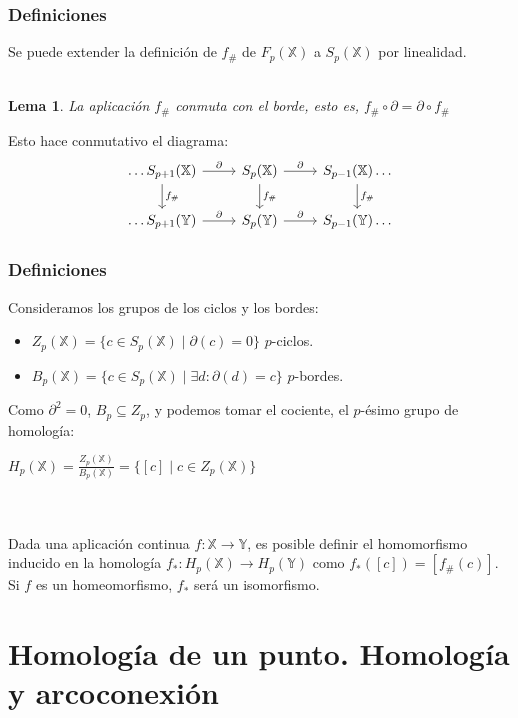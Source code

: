 \documentclass{beamer}
\def\X{{\mathbb X}}
\def\Y{{\mathbb Y}}
\theoremstyle{theorem}
\newtheorem{mylemma}{Lema}
\begin{document}
\begin{frame}[fragile]
  \frametitle{Definiciones}
  Se puede extender la definición de $f_\#$ de $F_p(\X)$ a $S_p(\X)$ por linealidad. \\~\\

  \begin{mylemma}
    La aplicación $f_\#$ conmuta con el borde, esto es, $f_\# \circ \partial = \partial \circ f_\#$
  \end{mylemma}

  Esto hace conmutativo el diagrama:
  \[
    \begin{tikzcd}
      \dots S_{p+1}(\X) \arrow{r}{\partial} \arrow{d}{f_\#} & S_p(\X) \arrow{r}{\partial} \arrow{d}{f_\#} & S_{p-1}(\X) \arrow{d}{f_\#} \dots \\
      \dots S_{p+1}(\Y) \arrow{r}{\partial}                 & S_p(\Y) \arrow{r}{\partial}                 & S_{p-1}(\Y) \dots
    \end{tikzcd}
  \]

\end{frame}



\begin{frame}
  \frametitle{Definiciones}
  Consideramos los grupos de los ciclos y los bordes:
  \begin{itemize}
    \item $Z_p(\X) = \{c \in S_p(\X) \mid \partial(c) = 0\}$ $p$-ciclos.
    \item $B_p(\X) = \{c \in S_p(\X) \mid \exists d \colon \partial(d) = c\}$ $p$-bordes.
  \end{itemize}

  Como $\partial^2 = 0$, $B_p \subseteq Z_p$, y podemos tomar el cociente, el $p$-ésimo grupo de homología:
  \centerline{$H_p(\X) = \frac{Z_p(\X)}{B_p(\X)} = \{[c] \mid c \in Z_p(\X)\}$} \\~\\

  Dada una aplicación continua $f \colon \X \to \Y$, es posible definir el homomorfismo inducido en
  la homología $f_* \colon H_p(\X) \to H_p(\Y)$ como $f_*([c]) = [f_\#(c)]$. Si $f$ es un homeomorfismo,
  $f_*$ será un isomorfismo.

\end{frame}


\section{Homología de un punto. Homología y arcoconexión}
\end{document}
